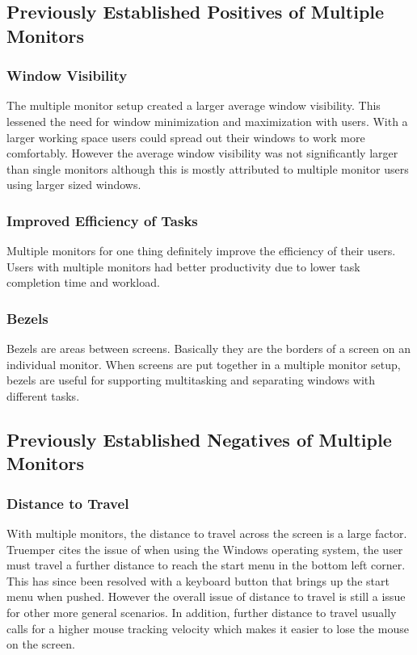 \documentclass[a4paper]{article}
\begin{document}
\subsection{Previously Established Positives of Multiple Monitors}

\subsubsection{Window Visibility}
The multiple monitor setup created a larger average window visibility.\cite{Hutchings} This lessened the need for window minimization and maximization with users.\cite{Grudin} With a larger working space users could spread out their windows to work more comfortably.\cite{Truemper} However the average window visibility was not significantly larger than single monitors although this is mostly attributed to multiple monitor users using larger sized windows.\cite{Hutchings}

\subsubsection{Improved Efficiency of Tasks}
Multiple monitors for one thing definitely improve the efficiency of their users. Users with multiple monitors had better productivity due to lower task completion time and workload.\cite{Kang}

\subsubsection{Bezels}
Bezels are areas between screens.\cite{Truemper} Basically they are the borders of a screen on an individual monitor. When screens are put together in a multiple monitor setup, bezels are useful for supporting multitasking and separating windows with different tasks.



\subsection{Previously Established Negatives of Multiple Monitors}

\subsubsection{Distance to Travel}
With multiple monitors, the distance to travel across the screen is a large factor. Truemper cites the issue of when using the Windows operating system, the user must travel a further distance to reach the start menu in the bottom left corner.\cite{Truemper} This has since been resolved with a keyboard button that brings up the start menu when pushed. However the overall issue of distance to travel is still a issue for other more general scenarios.\cite{Truemper} In addition, further distance to travel usually calls for a higher mouse tracking velocity which makes it easier to lose the mouse on the screen. \cite{Truemper}
\end{document}
